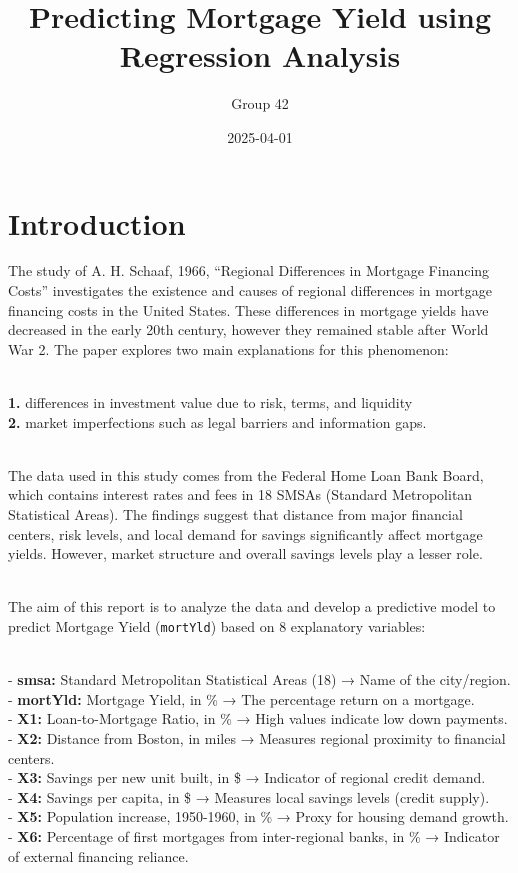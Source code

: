 \documentclass[
  11pt,
]{article}
\title{Predicting Mortgage Yield using Regression Analysis}
\author{Group 42}
\date{2025-04-01}
\begin{document}
\maketitle

\section{Introduction}\label{introduction}

The study of A. H. Schaaf, 1966, ``Regional Differences in Mortgage
Financing Costs'' investigates the existence and causes of regional
differences in mortgage financing costs in the United States. These
differences in mortgage yields have decreased in the early 20th century,
however they remained stable after World War 2. The paper explores two
main explanations for this phenomenon:\\
\strut \\
\textbf{1.} differences in investment value due to risk, terms, and
liquidity\\
\textbf{2.} market imperfections such as legal barriers and information
gaps.\\
\strut \\
The data used in this study comes from the Federal Home Loan Bank Board,
which contains interest rates and fees in 18 SMSAs (Standard
Metropolitan Statistical Areas). The findings suggest that distance from
major financial centers, risk levels, and local demand for savings
significantly affect mortgage yields. However, market structure and
overall savings levels play a lesser role.\\
\strut \\
The aim of this report is to analyze the data and develop a predictive
model to predict Mortgage Yield (\texttt{mortYld}) based on 8
explanatory variables:\\
\strut \\
- \textbf{smsa:} Standard Metropolitan Statistical Areas (18) → Name of
the city/region.\\
- \textbf{mortYld:} Mortgage Yield, in \% → The percentage return on a
mortgage.\\
- \textbf{X1:} Loan-to-Mortgage Ratio, in \% → High values indicate low
down payments.\\
- \textbf{X2:} Distance from Boston, in miles → Measures regional
proximity to financial centers.\\
- \textbf{X3:} Savings per new unit built, in \$ → Indicator of regional
credit demand.\\
- \textbf{X4:} Savings per capita, in \$ → Measures local savings levels
(credit supply).\\
- \textbf{X5:} Population increase, 1950-1960, in \% → Proxy for housing
demand growth.\\
- \textbf{X6:} Percentage of first mortgages from inter-regional banks,
in \% → Indicator of external financing reliance.
\end{document}
